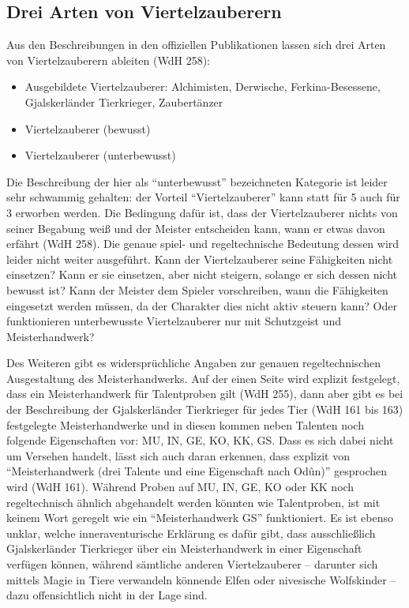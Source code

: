 \subsection{Drei Arten von Viertelzauberern}
Aus den Beschreibungen in den offiziellen Publikationen lassen sich drei Arten von Viertelzauberern ableiten (WdH 258):
\begin{itemize}
	\item Ausgebildete Viertelzauberer: Alchimisten, Derwische, Ferkina-Besessene, Gjalskerländer Tierkrieger, Zaubertänzer
	\item Viertelzauberer (bewusst)
	\item Viertelzauberer (unterbewusst)
\end{itemize}
Die Beschreibung der hier als \enquote{unterbewusst} bezeichneten Kategorie ist leider sehr schwammig gehalten: der Vorteil \enquote{Viertelzauberer} kann statt für \SI{5}{\GP} auch für \SI{3}{\GP} erworben werden. Die Bedingung dafür ist, dass der Viertelzauberer nichts von seiner Begabung weiß und der Meister entscheiden kann, wann er etwas davon erfährt (WdH 258). Die genaue spiel- und regeltechnische Bedeutung dessen wird leider nicht weiter ausgeführt. Kann der Viertelzauberer seine Fähigkeiten nicht einsetzen? Kann er sie einsetzen, aber nicht steigern, solange er sich dessen nicht bewusst ist? Kann der Meister dem Spieler vorschreiben, wann die Fähigkeiten eingesetzt werden müssen, da der Charakter dies nicht aktiv steuern kann? Oder funktionieren unterbewusste Viertelzauberer nur mit Schutzgeist und Meisterhandwerk?

Des Weiteren gibt es widersprüchliche Angaben zur genauen regeltechnischen Ausgestaltung des Meisterhandwerks. Auf der einen Seite wird explizit festgelegt, dass ein Meisterhandwerk für Talentproben gilt (WdH 255), dann aber gibt es bei der Beschreibung der Gjalskerländer Tierkrieger für jedes Tier (WdH 161 bis 163) festgelegte Meisterhandwerke und in diesen kommen neben Talenten noch folgende Eigenschaften vor: MU, IN, GE, KO, KK, GS. Dass es sich dabei nicht um Versehen handelt, lässt sich auch daran erkennen, dass explizit von \enquote{Meisterhandwerk (drei Talente und eine Eigenschaft nach Odûn)} gesprochen wird (WdH 161). Während Proben auf MU, IN, GE, KO oder KK noch regeltechnisch ähnlich abgehandelt werden könnten wie Talentproben, ist mit keinem Wort geregelt wie ein \enquote{Meisterhandwerk GS} funktioniert. Es ist ebenso unklar, welche inneraventurische Erklärung es dafür gibt, dass ausschließlich Gjalskerländer Tierkrieger über ein Meisterhandwerk in einer Eigenschaft verfügen können, während sämtliche anderen Viertelzauberer -- darunter sich mittels Magie in Tiere verwandeln könnende Elfen oder nivesische Wolfskinder -- dazu offensichtlich nicht in der Lage sind.

